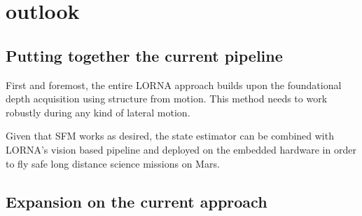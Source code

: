 \chapter{outlook}
\label{sec:outlook}
\section{Putting together the current pipeline}

First and foremost, the entire LORNA approach builds upon the foundational depth acquisition using structure from motion. This method needs to work robustly during any kind of lateral motion.

Given that SFM works as desired, the state estimator can be combined with LORNA's vision based pipeline and deployed on the embedded hardware in order to fly safe long distance science missions on Mars. 

\section{Expansion on the current approach}

